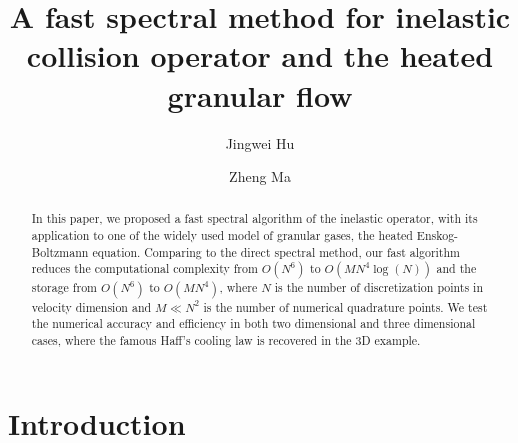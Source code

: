 \documentclass[review, times]{elsarticle}
\begin{document}
\begin{frontmatter}

\title{A fast spectral method for inelastic collision operator and the heated granular flow}


\author[mymainaddress]{Jingwei Hu}

\author[mymainaddress]{Zheng Ma}

\address[mymainaddress]{150 N. University Street, West Lafayette, IN, USA}

\begin{abstract}
In this paper, we proposed a fast spectral algorithm of the inelastic operator, with its application to one of the widely used model of granular gases, the heated Enskog-Boltzmann equation. Comparing to the direct spectral method, our fast algorithm reduces the computational complexity from $O\left(N^6\right)$ to $O\left(MN^4\log(N) \right)$ and the storage from $O(N^6)$ to $O\left( MN^4\right)$, where $N$ is the number of discretization points in velocity dimension and $M \ll N^2$ is the number of numerical quadrature points. We test the numerical accuracy and efficiency in both two dimensional and three dimensional cases, where the famous Haff's cooling law is recovered in the 3D example.
\end{abstract}


\end{frontmatter}

\linenumbers

\section{Introduction}
\end{document}
